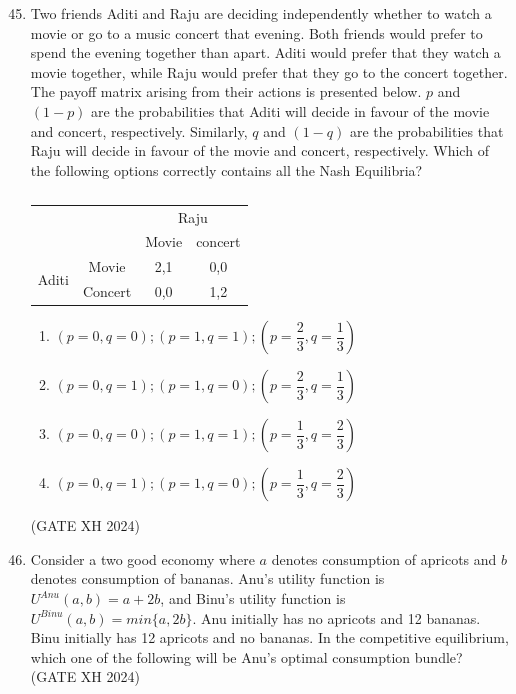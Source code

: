 \documentclass{article}
\begin{document}
\begin{enumerate}
\setcounter{enumi}{44}

    \item Two friends Aditi and Raju are deciding independently whether to watch a movie or go to a music concert that evening. Both friends would prefer to spend the evening together than apart. Aditi would prefer that they watch a movie together, while Raju would prefer that they go to the concert together. The payoff matrix arising from their actions is presented below. $p$ and $(1-p)$ are the probabilities that Aditi will decide in favour of the movie and concert, respectively. Similarly, $q$ and $(1-q)$ are the probabilities that Raju will decide in favour of the movie and concert, respectively. Which of the following options correctly contains all the Nash Equilibria? \\
    \begin{table}[h]
        \centering    
    \begin{tabular}{|c|c|c|c|}
    \hline
     \multicolumn{2}{|c|}{} & \multicolumn{2}{c|}{Raju} \\ \cline{3-4}
     \multicolumn{2}{|c|}{} & Movie & concert \\ \hline
     \multirow{2}{*}{Aditi} & Movie & 2,1 & 0,0 \\ \cline{2-4}
     & Concert & 0,0 & 1,2 \\ \hline    
    \end{tabular}
    \caption{}

    \end{table}

    \begin{multicols}{2}
    \begin{enumerate}
        \item $(p = 0,q = 0); (p=1,q=1); (p=\dfrac{2}{3},q=\dfrac{1}{3})$
        \item $(p=0,q=1);(p=1,q=0);(p=\dfrac{2}{3},q=\dfrac{1}{3})$
        \item $(p = 0,q = 0); (p=1,q=1); (p=\dfrac{1}{3},q=\dfrac{2}{3})$
        \item $(p=0,q=1);(p=1,q=0);(p=\dfrac{1}{3},q=\dfrac{2}{3})$
     \end{enumerate}
     \end{multicols} \hfill (GATE XH 2024)

    \item Consider a two good economy where $a$ denotes consumption of apricots and $b$ denotes consumption of bananas. Anu’s utility function is $U^{Anu}(a,b)=a+2b$, and Binu’s utility function is $U^{Binu}(a,b)=min\{a,2b\}$. Anu initially has no apricots and 12 bananas. Binu initially has 12 apricots and no bananas. In the competitive equilibrium, which one of the following will be Anu’s optimal consumption bundle? \hfill (GATE XH 2024)


\end{enumerate}
\end{document}
